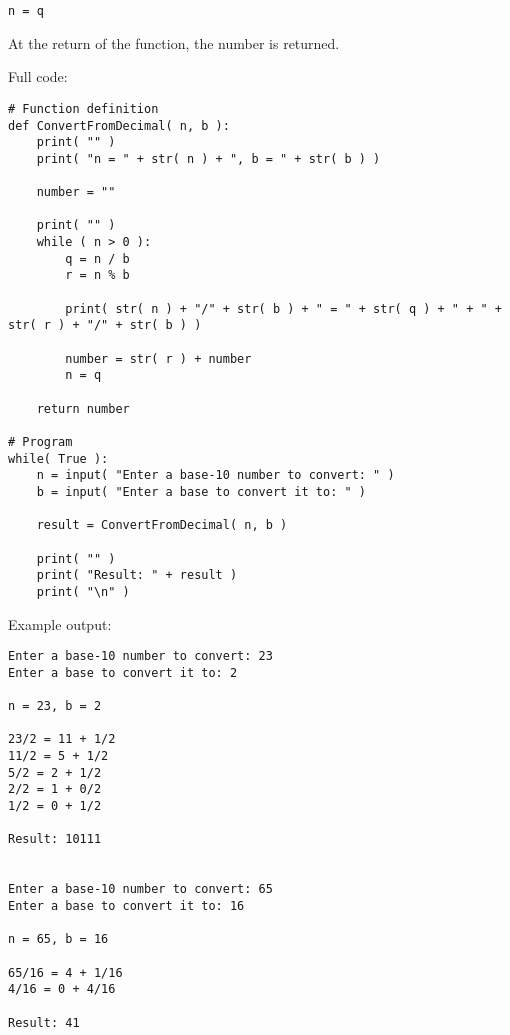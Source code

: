 \documentclass[a4paper,12pt]{book}
\begin{document}
\begin{verbatim}
n = q
\end{verbatim}

    At the return of the function, the number is returned.

    \newpage

    Full code:

\begin{lstlisting}[style=pycode]
# Function definition
def ConvertFromDecimal( n, b ):
    print( "" )
    print( "n = " + str( n ) + ", b = " + str( b ) )

    number = ""

    print( "" )
    while ( n > 0 ):
        q = n / b
        r = n % b

        print( str( n ) + "/" + str( b ) + " = " + str( q ) + " + " + str( r ) + "/" + str( b ) )

        number = str( r ) + number
        n = q

    return number

# Program
while( True ):
    n = input( "Enter a base-10 number to convert: " )
    b = input( "Enter a base to convert it to: " )

    result = ConvertFromDecimal( n, b )

    print( "" )
    print( "Result: " + result )
    print( "\n" )
\end{lstlisting}

    \newpage

    Example output:

\begin{lstlisting}[style=output]
Enter a base-10 number to convert: 23
Enter a base to convert it to: 2

n = 23, b = 2

23/2 = 11 + 1/2
11/2 = 5 + 1/2
5/2 = 2 + 1/2
2/2 = 1 + 0/2
1/2 = 0 + 1/2

Result: 10111


Enter a base-10 number to convert: 65
Enter a base to convert it to: 16

n = 65, b = 16

65/16 = 4 + 1/16
4/16 = 0 + 4/16

Result: 41
\end{lstlisting}
    
\end{document}
